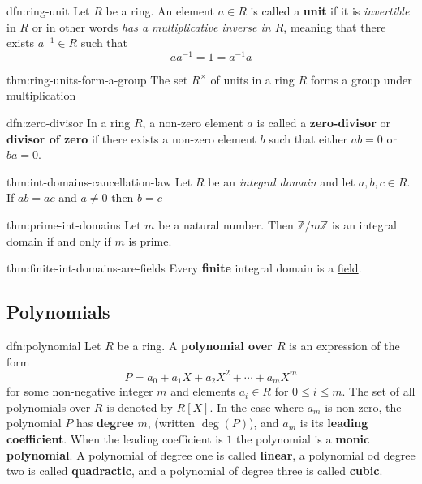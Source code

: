 \documentclass[landscape, 8pt]{extarticle}
\begin{document}
\begin{multicols}{3}
\begin{dfn}{dfn:ring-unit}{}
    Let $R$ be a ring. An element $a\in R$ is called a \textbf{unit} if it is \textit{invertible} in $R$ or in other words \textit{has a multiplicative inverse in $R$}, meaning that there exists $a^{-1}\in R$ such that
    \[aa^{-1} = 1 = a^{-1} a\]
\end{dfn}

\begin{thm}[]{thm:ring-units-form-a-group}{}
    The set $R^{\times}$ of units in a ring $R$ forms a group under multiplication
\end{thm}

\begin{dfn}{dfn:zero-divisor}{}
    In a ring $R$, a non-zero element $a$ is called a \textbf{zero-divisor} or \textbf{divisor of zero} if there exists a non-zero element $b$ such that either $ab = 0$ or $ba = 0$.
\end{dfn}

\begin{thm}{thm:int-domains-cancellation-law}{}
    Let $R$ be an \textit{integral domain} and let $a,b,c\in R$. If $ab = ac$ and $a\ne 0$ then $b = c$
\end{thm}

\begin{thm}{thm:prime-int-domains}{}
    Let $m$ be a natural number. Then $\mathbb{Z} / m\mathbb{Z}$ is an integral domain if and only if $m$ is prime.
\end{thm}

\begin{thm}[]{thm:finite-int-domains-are-fields}{}
    Every \textbf{finite} integral domain is a \hyperref[dfn:field]{field}.
\end{thm}

\subsection{Polynomials}

\begin{dfn}[Polynomial]{dfn:polynomial}{}
    Let $R$ be a ring. A \textbf{polynomial over $R$} is an expression of the form
    \[P = a_{0} + a_{1}X + a_{2}X^{2} + \cdots + a_{m}X^{m}\]
    for some non-negative integer $m$ and elements $a_{i}\in R$ for $0 \le i \le m$. The set of all polynomials over $R$ is denoted by $R[X]$. In the case where $a_{m}$ is non-zero, the polynomial $P$ has \textbf{degree} $m$, (written $\deg(P)$), and $a_{m}$ is its \textbf{leading coefficient}. When the leading coefficient is $1$ the polynomial is a \textbf{monic polynomial}. A polynomial of degree one is called \textbf{linear}, a polynomial od degree two is called \textbf{quadractic}, and a polynomial of degree three is called \textbf{cubic}.
\end{dfn}


\end{multicols}
\end{document}
